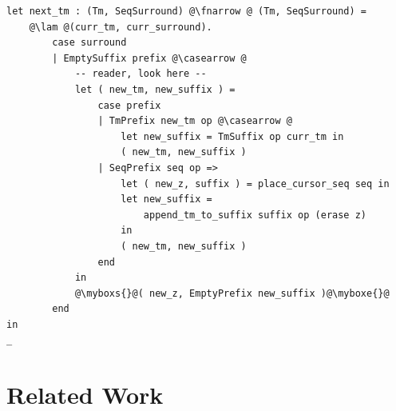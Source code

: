 \documentclass[runningheads]{llncs}
\begin{document}
\begin{minipage}{\linewidth}
\begin{lstlisting}
let next_tm : (Tm, SeqSurround) @\fnarrow @ (Tm, SeqSurround) =
	@\lam @(curr_tm, curr_surround).
		case surround
		| EmptySuffix prefix @\casearrow @
			-- reader, look here --
			let ( new_tm, new_suffix ) =
				case prefix
				| TmPrefix new_tm op @\casearrow @
					let new_suffix = TmSuffix op curr_tm in
					( new_tm, new_suffix )
				| SeqPrefix seq op =>
					let ( new_z, suffix ) = place_cursor_seq seq in
					let new_suffix =
						append_tm_to_suffix suffix op (erase z)
					in
					( new_tm, new_suffix )
				end
			in
			@\myboxs{}@( new_z, EmptyPrefix new_suffix )@\myboxe{}@
		end
in
_
\end{lstlisting}
\end{minipage}

\newpage

\section{Related Work} \label{sec:related-work}
\end{document}
